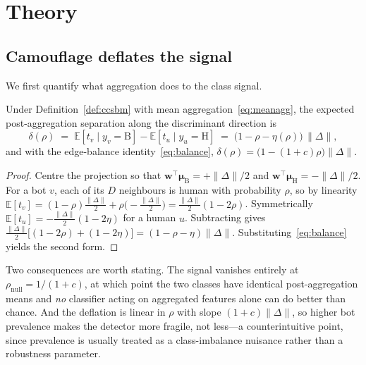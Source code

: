 \documentclass[../elsevier.tex]{subfiles}
\begin{document}
\section{Theory}
\label{sec:theory}

\subsection{Camouflage deflates the signal}

We first quantify what aggregation does to the class signal.

\begin{proposition}
\label{prop:deflation}
Under Definition~\ref{def:ccsbm} with mean aggregation~\eqref{eq:meanagg}, the
expected post-aggregation separation along the discriminant direction is
\begin{equation}
    \delta(\rho) \;=\; \mathbb{E}[t_v \mid y_v = \mathrm{B}]
                     - \mathbb{E}[t_u \mid y_u = \mathrm{H}]
                \;=\; \bigl(1 - \rho - \eta(\rho)\bigr)\,\|\Delta\| ,
    \label{eq:deflation}
\end{equation}
and with the edge-balance identity~\eqref{eq:balance},
$\delta(\rho) = \bigl(1 - (1+c)\rho\bigr)\|\Delta\|$.
\end{proposition}

\begin{proof}
Centre the projection so that $\mathbf{w}^\top\boldsymbol{\mu}_{\mathrm{B}} =
+\|\Delta\|/2$ and $\mathbf{w}^\top\boldsymbol{\mu}_{\mathrm{H}} = -\|\Delta\|/2$.
For a bot $v$, each of its $D$ neighbours is human with probability $\rho$, so by
linearity
$\mathbb{E}[t_v] = (1-\rho)\tfrac{\|\Delta\|}{2} + \rho\bigl(-\tfrac{\|\Delta\|}{2}\bigr)
= \tfrac{\|\Delta\|}{2}(1-2\rho)$.
Symmetrically $\mathbb{E}[t_u] = -\tfrac{\|\Delta\|}{2}(1-2\eta)$ for a human $u$.
Subtracting gives $\tfrac{\|\Delta\|}{2}\bigl[(1-2\rho)+(1-2\eta)\bigr] =
(1-\rho-\eta)\|\Delta\|$. Substituting~\eqref{eq:balance} yields the second form.
\end{proof}

Two consequences are worth stating. The signal vanishes entirely at
$\rho_{\mathrm{null}} = 1/(1+c)$, at which point the two classes have identical
post-aggregation means and \emph{no} classifier acting on aggregated features
alone can do better than chance. And the deflation is linear in $\rho$ with slope
$(1+c)\|\Delta\|$, so higher bot prevalence makes the detector more fragile, not
less---a counterintuitive point, since prevalence is usually treated as a
class-imbalance nuisance rather than a robustness parameter.
\end{document}

